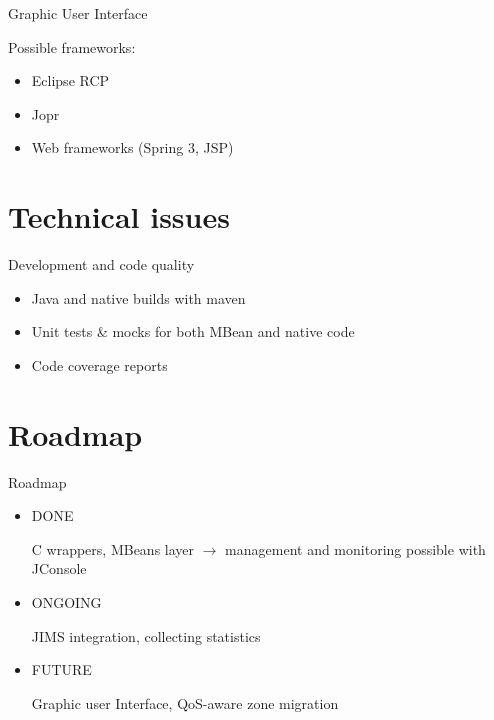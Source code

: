 \documentclass{beamer}
\begin{document}
		\begin{frame}{Graphic User Interface}

			\begin{center}
				Possible frameworks:
				\begin{itemize}
					\item Eclipse RCP
					\item Jopr
					\item Web frameworks (Spring 3, JSP)
				
				\end{itemize}
			\end{center}
		\end{frame}


\section{Technical issues}

	\begin{frame}{Development and code quality}

		\begin{itemize}
			\item Java and native builds with maven
			\item Unit tests \& mocks for both MBean and native code
			\item Code coverage reports
		\end{itemize}
	
	\end{frame}


\section{Roadmap}

	\begin{frame}{Roadmap}
		
		\begin{itemize}

			\item DONE
			
				C wrappers, MBeans layer $\rightarrow$ management and monitoring possible with JConsole

			\item ONGOING
			
				JIMS integration, collecting statistics

			\item FUTURE
			
				Graphic user Interface, QoS-aware zone migration

		\end{itemize}

	\end{frame}
\end{document}
